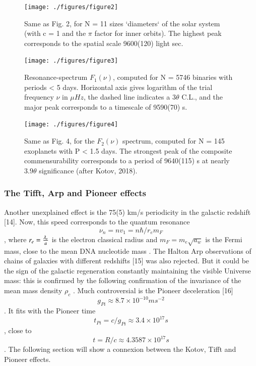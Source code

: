 \documentclass[twoside,draft]{article}
\begin{document}
\begin{sloppypar}
{\begin{figure}
\centering
\texttt{[image: ./figures/figure2]}
\caption{Same as Fig. 2, for N = 11 sizes `diameters` of the solar system (with c = 1 and the $\pi$
factor for inner orbits). The highest peak corresponds to the spatial scale 9600(120) light sec.}
\label{fig:figure_label}
\end{figure}

\begin{figure}
\centering
\texttt{[image: ./figures/figure3]}
\caption{Resonance-spectrum $F_{1} ( \nu)$, computed for N = 5746 binaries with periods < 5 days.
Horizontal axis gives logarithm of the trial frequency $\nu$ in $\mu Hz$, the dashed line indicates a $3 \theta$
C.L., and the major peak corresponds to a timescale of 9590(70) s.}
\label{fig:figure_label}
\end{figure}

\begin{figure}
\centering
\texttt{[image: ./figures/figure4]}
\caption{Same as Fig. 4, for the $F_{2} ( \nu )$ spectrum, computed for N = 145 exoplanets with P < 1.5
days. The strongest peak of the composite commensurability corresponds to a period of 9640(115) s
at nearly $3.9\theta$ significance (after Kotov, 2018).}
\label{fig:figure_label}
\end{figure}

\subsubsection{The Tifft, Arp and Pioneer effects}

Another unexplained effect is the 75(5) km/s periodicity in the galactic redshift [14]. Now, this
speed corresponds to the quantum resonance $$\nu_{n} = nv_{1} =n\hbar /r_{e} m_{F} $$, where $r_{e} = \frac{\lambdabar_{e}}{a}$ is the electron classical radius and $m_{F} = m_{e}\sqrt{a_{w}}$ is the Fermi mass, close to the mean DNA nucleotide mass \cite{fm1}.
The Halton Arp observations of chains of galaxies with different redshifts [15] was also
rejected. But it could be the sign of the galactic regeneration constantly maintaining the visible
Universe mass: this is confirmed by the following confirmation of the invariance of the mean mass
density $\rho_{c}$ .
Much controversial is the Pioneer deceleration [16] $$g_{Pi} \approx 8.7 \times 10^{-10} ms^{-2}$$. It fits with
the Pioneer time $$t_{Pi} = c/g_{Pi} \approx 3.4 \times 10^{17} s$$, close to $$t = R/c \approx 4.3587 \times 10^{17} s$$. The following section will show a connexion between the Kotov, Tifft and Pioneer effects.

}
\end{sloppypar}
\end{document}
